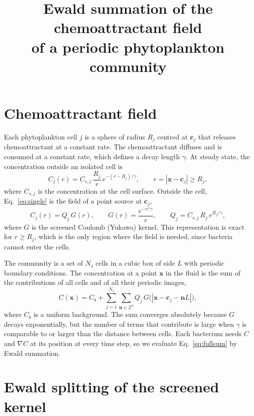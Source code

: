 \documentclass[11pt,a4paper]{article}
\title{Ewald summation of the chemoattractant field\\ of a periodic phytoplankton community}
\author{}
\date{}
\newcommand{\vect}[1]{\mathbf{#1}}
\begin{document}
\maketitle

\section{Chemoattractant field}

Each phytoplankton cell $j$ is a sphere of radius $R_j$ centred at $\vect{c}_j$ that releases
chemoattractant at a constant rate. The chemoattractant diffuses and is consumed at a constant
rate, which defines a decay length $\gamma$. At steady state, the concentration outside an isolated
cell is
\begin{equation}
  C_j(r) = C_{s,j}\,\frac{R_j}{r}\,e^{-(r-R_j)/\gamma}, \qquad r = |\vect{x}-\vect{c}_j| \ge R_j,
  \label{eq:single}
\end{equation}
where $C_{s,j}$ is the concentration at the cell surface. Outside the cell, Eq.~\eqref{eq:single}
is the field of a point source at $\vect{c}_j$,
\begin{equation}
  C_j(r) = Q_j\,G(r), \qquad G(r) = \frac{e^{-r/\gamma}}{r}, \qquad Q_j = C_{s,j}\,R_j\,e^{R_j/\gamma},
  \label{eq:pointsource}
\end{equation}
where $G$ is the screened Coulomb (Yukawa) kernel. This representation is exact for $r \ge R_j$,
which is the only region where the field is needed, since bacteria cannot enter the cells.

The community is a set of $N_s$ cells in a cubic box of side $L$ with periodic boundary conditions.
The concentration at a point $\vect{x}$ in the fluid is the sum of the contributions of all cells
and of all their periodic images,
\begin{equation}
  C(\vect{x}) = C_b + \sum_{j=1}^{N_s} \sum_{\vect{n}\in\mathbb{Z}^3} Q_j\,
  G\bigl(|\vect{x} - \vect{c}_j - \vect{n}L|\bigr),
  \label{eq:fullsum}
\end{equation}
where $C_b$ is a uniform background. The sum converges absolutely because $G$ decays exponentially,
but the number of terms that contribute is large when $\gamma$ is comparable to or larger than the
distance between cells. Each bacterium needs $C$ and $\nabla C$ at its position at every time step,
so we evaluate Eq.~\eqref{eq:fullsum} by Ewald summation.

\section{Ewald splitting of the screened kernel}
\end{document}
